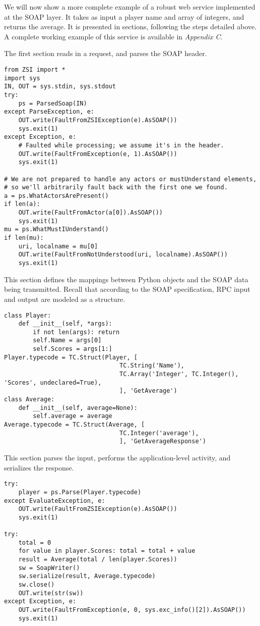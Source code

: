We will now show a more complete example of a robust web service implemented at
the SOAP layer. It takes as input a player name and array of integers, and returns
the average.  It is presented in sections, following the steps detailed above. 
A complete working example of this service is available in \emph{Appendix C}.

The first section reads in a request, and parses the SOAP header.

\begin{verbatim}
from ZSI import *
import sys
IN, OUT = sys.stdin, sys.stdout
try:
    ps = ParsedSoap(IN)
except ParseException, e:
    OUT.write(FaultFromZSIException(e).AsSOAP())
    sys.exit(1)
except Exception, e:
    # Faulted while processing; we assume it's in the header.
    OUT.write(FaultFromException(e, 1).AsSOAP())
    sys.exit(1)

# We are not prepared to handle any actors or mustUnderstand elements,
# so we'll arbitrarily fault back with the first one we found.
a = ps.WhatActorsArePresent()
if len(a):
    OUT.write(FaultFromActor(a[0]).AsSOAP())
    sys.exit(1)
mu = ps.WhatMustIUnderstand()
if len(mu):
    uri, localname = mu[0]
    OUT.write(FaultFromNotUnderstood(uri, localname).AsSOAP())
    sys.exit(1)
\end{verbatim}

This section defines the mappings between Python objects and the SOAP
data being transmitted.  Recall that according to the SOAP specification, RPC
input and output are modeled as a structure.

\begin{verbatim}
class Player:
    def __init__(self, *args):
        if not len(args): return
        self.Name = args[0]
        self.Scores = args[1:]
Player.typecode = TC.Struct(Player, [
                                TC.String('Name'),
                                TC.Array('Integer', TC.Integer(), 'Scores', undeclared=True),
                                ], 'GetAverage')
class Average:
    def __init__(self, average=None):
        self.average = average
Average.typecode = TC.Struct(Average, [
                                TC.Integer('average'),
                                ], 'GetAverageResponse')
\end{verbatim}

This section parses the input, performs the application-level
activity, and serializes the response.
\begin{verbatim}
try:
    player = ps.Parse(Player.typecode)
except EvaluateException, e:
    OUT.write(FaultFromZSIException(e).AsSOAP())
    sys.exit(1)

try:
    total = 0
    for value in player.Scores: total = total + value
    result = Average(total / len(player.Scores))
    sw = SoapWriter()
    sw.serialize(result, Average.typecode)
    sw.close()
    OUT.write(str(sw))
except Exception, e:
    OUT.write(FaultFromException(e, 0, sys.exc_info()[2]).AsSOAP())
    sys.exit(1)
\end{verbatim}

